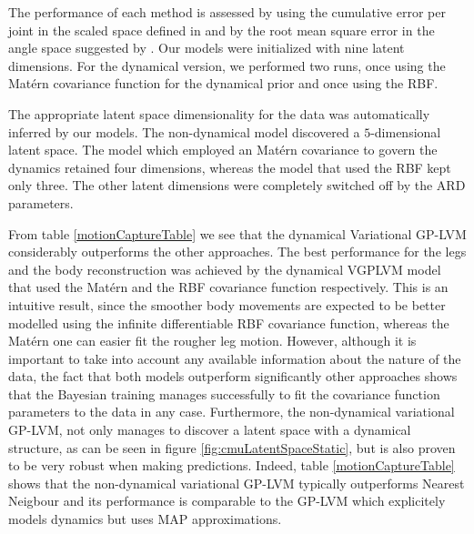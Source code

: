 \par The performance of each method is assessed by using the cumulative
error per joint in the scaled space defined in \cite{Taylor} and by
the root mean square error in the angle space suggested by
\cite{gplvmLarger}. Our models were initialized with nine latent
dimensions. For the dynamical version, we performed two runs, once using the Mat\'ern covariance
function for the dynamical prior and once using the RBF.

%
The appropriate latent space dimensionality for the data was
automatically inferred by our models. 
The non-dynamical model
discovered a $5$-dimensional latent space.
The model which employed an Mat\'ern covariance to govern the dynamics retained four dimensions,
whereas the model that used the RBF kept only three. 
%
%
The other latent dimensions were completely switched off by the ARD
parameters.



 From table
\ref{motionCaptureTable} we see that the dynamical Variational GP-LVM
considerably outperforms the other approaches.
The best performance for the legs and the body
reconstruction was achieved by the dynamical VGPLVM model that used the Mat\'ern
and the RBF covariance function respectively. This is an intuitive result, since the smoother
body movements are expected to be better modelled using the infinite differentiable
RBF covariance function, whereas the Mat\'ern one can easier fit the rougher leg motion.
However, although it is important to take into account any available information about the nature of
the data, the fact that both models outperform significantly other approaches shows that the Bayesian
training manages successfully to fit the covariance function parameters to the data in any case.
%
%
Furthermore, the non-dynamical variational GP-LVM, not only manages to discover a latent space with a dynamical
structure, as can be seen in figure \ref{fig:cmuLatentSpaceStatic}, but is also proven to be very robust when making predictions. Indeed,
table \ref{motionCaptureTable} shows that the non-dynamical variational GP-LVM typically outperforms Nearest Neigbour
and its performance is comparable to the GP-LVM which explicitely models dynamics but uses MAP approximations.




